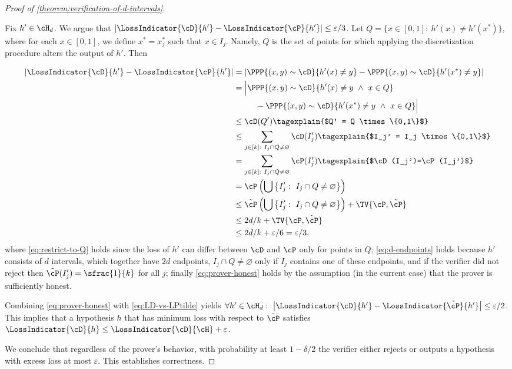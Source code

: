 \documentclass{toc}
\begin{document}
\begin{proof}[Proof of \cref{theorem:verification-of-d-intervals}]
\begin{itemize}
{			Fix $h' \in \cH_d$. We argue that $\left|\LossIndicator{\cD}{h'} - \LossIndicator{\cP}{h'}\right| \leq \varepsilon/3$. 
			Let $Q = \{x \in [0,1]: ~ h'(x) \neq h'(x^*) \}$, where for each $x \in [0,1]$, we define $x^* = x_j^*$ such that $x \in I_j$. Namely, $Q$ is the set of points for which applying the discretization procedure alters the output of $h'$. Then

			\begingroup
			\allowdisplaybreaks
			\begin{align}
				\left|\LossIndicator{\cD}{h'}-\LossIndicator{\cP}{h'}\right| &= \left|\PPP{(x,y) \sim \cD}{h'(x) \neq y}-\PPP{(x,y) \sim \cD}{h'(x^*) \neq y}\right| \nonumber\\
				&= \Big|\PPP{(x,y) \sim \cD}{h'(x) \neq y ~ \land ~ x \in Q} \nonumber\\
				& ~~~~~~~~ -\PPP{(x,y) \sim \cD}{h'(x^*) \neq y  ~ \land ~ x \in Q}\Big| \label{eq:restrict-to-Q}\\
				&\leq \cD(Q') \tagexplain{$Q' = Q \times \{0,1\}$}\nonumber\\
				&\leq \sum_{j \in [k]: ~ I_j \cap Q \neq \varnothing} \cD(I_j') \tagexplain{$I_j' = I_j \times \{0,1\}$} \nonumber\\
				&= \sum_{j \in [k]: ~ I_j \cap Q \neq \varnothing} \cP(I_j') \tagexplain{$\cD(I_j')=\cP(I_j')$}\nonumber\\
				&=\cP\left(\bigcup\left\{I_j': ~ I_j \cap Q \neq \varnothing\right\}\right) \nonumber\\
				&\leq \tilde{\cP}\left(\bigcup\left\{I_j': ~ I_j \cap Q \neq \varnothing\right\}\right) + \TV{\cP,\tilde{\cP}} \nonumber\\
				&\leq 2d/k + \TV{\cP,\tilde{\cP}} \label{eq:d-endpoints}\\
				&\leq 2d/k + \varepsilon/6 = \varepsilon/3, \label{eq:prover-honest}
			\end{align}%
			\endgroup
			where \cref{eq:restrict-to-Q} holds since the loss of $h'$ can differ between $\cD$ and $\cP$ only for points in $Q$; \cref{eq:d-endpoints} holds because $h'$ consists of $d$ intervals, which together have $2d$ endpoints, $I_j \cap Q \neq \varnothing$ only if $I_j$ contains one of these endpoints, and if the verifier did not reject then $\tilde{\cP}(I_j') = \sfrac{1}{k}$ for all $j$; finally \cref{eq:prover-honest} holds by the assumption (in the current case) that the prover is sufficiently honest.

			Combining \cref{eq:prover-honest} with \cref{eq:LD-vs-LPtilde} yields $\forall h' \in \cH_d: ~ \left|\LossIndicator{\cD}{h'} - \LossIndicator{\tilde{\cP}}{h'}\right| \leq \varepsilon/2$. This implies that a hypothesis $h$ that has minimum loss with respect to $\tilde{\cP}$ satisfies $\LossIndicator{\cD}{h} \leq \LossIndicator{\cD}{\cH} + \varepsilon$. 
		}
	\end{itemize}
	We conclude that regardless of the prover's behavior, with probability at least $1-\delta/2$ the verifier either rejects or outputs a hypothesis with excess loss at most $\varepsilon$. This establishes correctness.


\end{proof}
\end{document}
